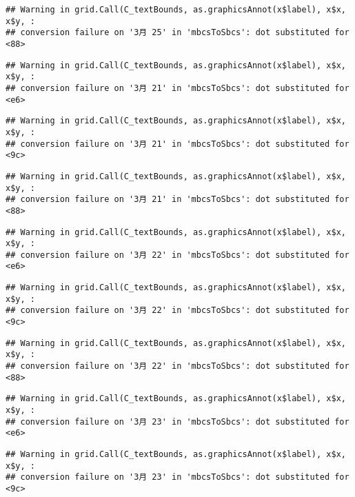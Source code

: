 \documentclass[
]{article}
\begin{document}
\begin{verbatim}
## Warning in grid.Call(C_textBounds, as.graphicsAnnot(x$label), x$x, x$y, :
## conversion failure on '3月 25' in 'mbcsToSbcs': dot substituted for <88>
\end{verbatim}

\begin{verbatim}
## Warning in grid.Call(C_textBounds, as.graphicsAnnot(x$label), x$x, x$y, :
## conversion failure on '3月 21' in 'mbcsToSbcs': dot substituted for <e6>
\end{verbatim}

\begin{verbatim}
## Warning in grid.Call(C_textBounds, as.graphicsAnnot(x$label), x$x, x$y, :
## conversion failure on '3月 21' in 'mbcsToSbcs': dot substituted for <9c>
\end{verbatim}

\begin{verbatim}
## Warning in grid.Call(C_textBounds, as.graphicsAnnot(x$label), x$x, x$y, :
## conversion failure on '3月 21' in 'mbcsToSbcs': dot substituted for <88>
\end{verbatim}

\begin{verbatim}
## Warning in grid.Call(C_textBounds, as.graphicsAnnot(x$label), x$x, x$y, :
## conversion failure on '3月 22' in 'mbcsToSbcs': dot substituted for <e6>
\end{verbatim}

\begin{verbatim}
## Warning in grid.Call(C_textBounds, as.graphicsAnnot(x$label), x$x, x$y, :
## conversion failure on '3月 22' in 'mbcsToSbcs': dot substituted for <9c>
\end{verbatim}

\begin{verbatim}
## Warning in grid.Call(C_textBounds, as.graphicsAnnot(x$label), x$x, x$y, :
## conversion failure on '3月 22' in 'mbcsToSbcs': dot substituted for <88>
\end{verbatim}

\begin{verbatim}
## Warning in grid.Call(C_textBounds, as.graphicsAnnot(x$label), x$x, x$y, :
## conversion failure on '3月 23' in 'mbcsToSbcs': dot substituted for <e6>
\end{verbatim}

\begin{verbatim}
## Warning in grid.Call(C_textBounds, as.graphicsAnnot(x$label), x$x, x$y, :
## conversion failure on '3月 23' in 'mbcsToSbcs': dot substituted for <9c>
\end{verbatim}
\end{document}
